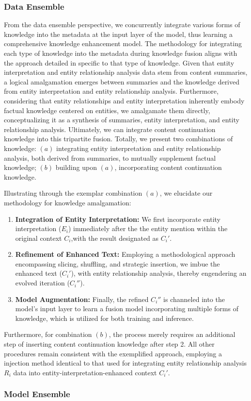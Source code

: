 \subsubsection{Data Ensemble}
\label{sec:data_ensemble}
 From the data ensemble perspective, we concurrently integrate various forms of knowledge into the metadata at the input layer of the model, thus learning a comprehensive knowledge enhancement model. The methodology for integrating each type of knowledge into the metadata during knowledge fusion aligns with the approach detailed in  specific to that type of knowledge. Given that entity interpretation and entity relationship analysis data stem from content summaries, a logical amalgamation emerges between summaries and the knowledge derived from entity interpretation and entity relationship analysis. Furthermore, considering that entity relationships and entity interpretation inherently embody factual knowledge centered on entities, we amalgamate them directly, conceptualizing it as a synthesis of summaries, entity interpretation, and entity relationship analysis. Ultimately, we can integrate content continuation knowledge into this tripartite fusion.
 Totally, we present two combinations of knowledge:
 $(a)$ integrating entity interpretation and entity relationship analysis, both derived from summaries, to mutually supplement factual knowledge;
 $(b)$ building upon $(a)$, incorporating content continuation knowledge.
 
 Illustrating through the exemplar combination $(a)$, we elucidate our methodology for knowledge amalgamation:
 \begin{enumerate}
 	\item \textbf{Integration of Entity Interpretation:} We first incorporate entity interpretation ($E_i$) immediately after the the entity mention within the original context $C_i$,with the result designated as $C_i'$.
 	\item \textbf{Refinement of Enhanced Text:} Employing a methodological approach encompassing slicing, shuffling, and strategic insertion, we imbue the enhanced text ($C_i'$), with  entity relationship analysis, thereby engendering an evolved iteration ($C_i''$).
 	\item \textbf{Model Augmentation:} Finally, the refined $C_i''$ is channeled into the model's input layer to learn a fusion model incorporating multiple forms of knowledge, which is utilized for both training and inference.
 \end{enumerate}
 Furthermore, for combination $(b)$, the process merely requires an additional step of inserting content continuation knowledge after step 2. All other procedures remain consistent with the exemplified approach, employing a injection method identical to that used for integrating entity relationship analysis $R_i$ data into entity-interpretation-enhanced context $C_i'$.
 

\subsubsection{Model Ensemble}
\label{sec:model_ensemble}



